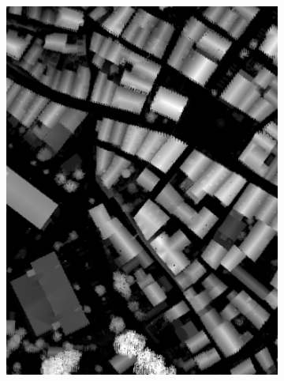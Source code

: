 \begin{figure}[htb]
\begin{subfigure}{0.19\textwidth}
  \includegraphics[width=1\linewidth]{fig/vai/5_hm.jpg}
\end{subfigure}
\begin{subfigure}{0.19\textwidth}
  \centering

\end{subfigure}
\end{figure}
